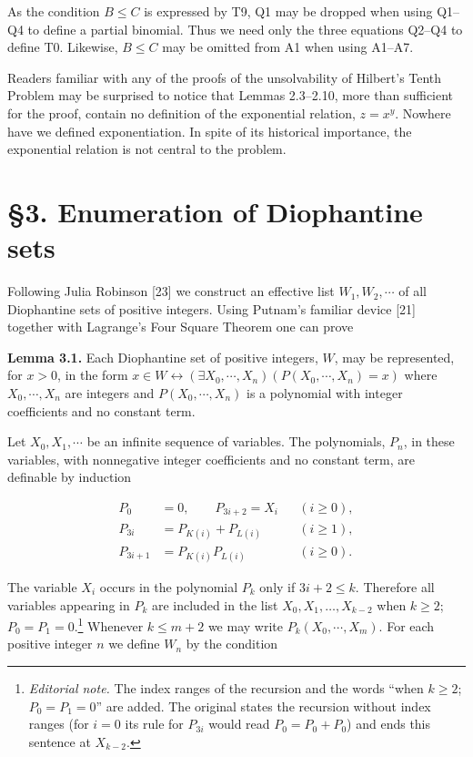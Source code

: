 \documentclass[11pt,a4paper]{article}
\newcommand{\origpage}[1]{\marginnote{\footnotesize\textbf{[#1]}}}
\newcommand{\ednote}[1]{\footnote{\textit{Editorial note.} #1}}
\begin{document}
As the condition $B\leq C$ is expressed by T9, Q1 may be dropped when
using Q1--Q4 to define a partial binomial. Thus we need only the three equations
Q2--Q4 to define T0. Likewise, $B\leq C$ may be omitted from A1 when using A1--A7.

Readers familiar with any of the proofs of the unsolvability of Hilbert's Tenth Problem may be surprised to notice that Lemmas 2.3--2.10, more than sufficient for the proof, contain no definition of the exponential relation, $z=x^{y}$. Nowhere have we defined exponentiation. In spite of its historical importance, the exponential relation is not central to the problem.


\section*{§3. Enumeration of Diophantine sets} Following Julia Robinson [23] we construct an effective list $W_{1}, W_{2}, \cdots$ of all Diophantine sets of positive integers. Using Putnam's familiar device [21] together with Lagrange's Four Square Theorem one can prove

\par{}\medskip\noindent\textbf{Lemma 3.1.} Each Diophantine set of positive integers, $W$, may be represented, for $x>0$, in the form $x \in W \leftrightarrow\left(\exists X_{0}, \cdots, X_{n}\right)\left(P\left(X_{0}, \cdots, X_{n}\right)=x\right)$ where $X_{0}, \cdots, X_{n}$ are integers and $P\left(X_{0}, \cdots, X_{n}\right)$ is a polynomial with integer coefficients and no constant term.

Let $X_{0}, X_{1}, \cdots$ be an infinite sequence of variables. The polynomials, $P_{n}$, in these variables, with nonnegative integer coefficients and no constant term, are definable by induction

$$
\begin{aligned}
P_0&=0,\qquad P_{3i+2}=X_i &&(i\geq0),\\
P_{3i}&=P_{K(i)}+P_{L(i)} &&(i\geq1),\\
P_{3i+1}&=P_{K(i)}P_{L(i)} &&(i\geq0).
\end{aligned}
$$

The variable $X_{i}$ occurs in the polynomial $P_{k}$ only if $3 i+2 \leq k$. Therefore all \origpage{346}variables appearing in $P_{k}$ are included in the list $X_0,X_1,\ldots,X_{k-2}$ when $k\geq2$; $P_0=P_1=0$.\ednote{The index ranges of the recursion and the words ``when $k\geq2$; $P_0=P_1=0$'' are added. The original states the recursion without index ranges (for $i=0$ its rule for $P_{3i}$ would read $P_0=P_0+P_0$) and ends this sentence at $X_{k-2}$.} Whenever $k \leq m+2$ we may write $P_{k}\left(X_{0}, \cdots, X_{m}\right)$. For each positive integer $n$ we define $W_{n}$ by the condition
\end{document}
